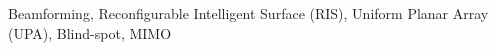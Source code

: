 \documentclass[conference]{IEEEtran}
\newcommand{\nariman}[1]{\textcolor{red}{#1}}
\newcommand{\amir}[1]{\textcolor{blue}{#1}}
\begin{document}
\begin{IEEEkeywords}
 Beamforming, Reconfigurable Intelligent Surface (RIS), Uniform Planar Array (UPA), Blind-spot, MIMO
\end{IEEEkeywords}




%
\IEEEpeerreviewmaketitle






% 

% 
% 


% 


\renewcommand{\nariman}[1]{\textcolor{red}{#1}}
\renewcommand{\amir}[1]{\textcolor{blue}{#1}}






%
%
%




\end{document}
